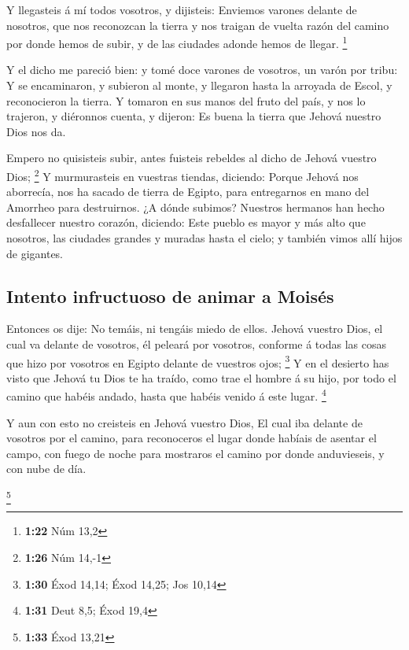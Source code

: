  Y llegasteis á mí todos vosotros, y dijisteis: Enviemos
varones delante de nosotros, que nos reconozcan la tierra y nos traigan
de vuelta razón del camino por donde hemos de subir, y de las ciudades
adonde hemos de llegar. \footnote{\textbf{1:22} Núm 13,2}

 Y el dicho me pareció bien: y tomé doce varones de
vosotros, un varón por tribu:  Y se encaminaron, y
subieron al monte, y llegaron hasta la arroyada de Escol, y reconocieron
la tierra.  Y tomaron en sus manos del fruto del país, y
nos lo trajeron, y diéronnos cuenta, y dijeron: Es buena la tierra que
Jehová nuestro Dios nos da.

 Empero no quisisteis subir, antes fuisteis rebeldes al
dicho de Jehová vuestro Dios; \footnote{\textbf{1:26} Núm 14,-1}
 Y murmurasteis en vuestras tiendas, diciendo: Porque
Jehová nos aborrecía, nos ha sacado de tierra de Egipto, para
entregarnos en mano del Amorrheo para destruirnos.  ¿A
dónde subimos? Nuestros hermanos han hecho desfallecer nuestro corazón,
diciendo: Este pueblo es mayor y más alto que nosotros, las ciudades
grandes y muradas hasta el cielo; y también vimos allí hijos de
gigantes.

\hypertarget{intento-infructuoso-de-animar-a-moisuxe9s}{%
\subsection{Intento infructuoso de animar a
Moisés}\label{intento-infructuoso-de-animar-a-moisuxe9s}}

 Entonces os dije: No temáis, ni tengáis miedo de ellos.
 Jehová vuestro Dios, el cual va delante de vosotros, él
peleará por vosotros, conforme á todas las cosas que hizo por vosotros
en Egipto delante de vuestros ojos; \footnote{\textbf{1:30} Éxod 14,14;
  Éxod 14,25; Jos 10,14}  Y en el desierto has visto que
Jehová tu Dios te ha traído, como trae el hombre á su hijo, por todo el
camino que habéis andado, hasta que habéis venido á este lugar.
\footnote{\textbf{1:31} Deut 8,5; Éxod 19,4}

 Y aun con esto no creisteis en Jehová vuestro Dios,
 El cual iba delante de vosotros por el camino, para
reconoceros el lugar donde habíais de asentar el campo, con fuego de
noche para mostraros el camino por donde anduvieseis, y con nube de día.

\footnote{\textbf{1:33} Éxod 13,21}


